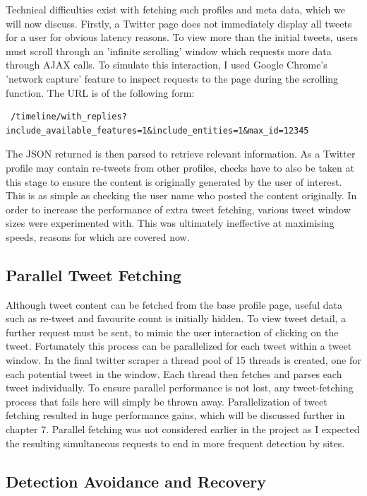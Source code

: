 Technical difficulties exist with fetching such profiles and meta data, which we will now discuss. Firstly, a Twitter page does not immediately display all tweets for a user for obvious latency reasons. To view more than the initial tweets, users must scroll through an 'infinite scrolling' window which requests more data through AJAX calls. To simulate this interaction, I used Google Chrome's 'network capture' feature to inspect requests to the page during the scrolling function. The URL is of the following form:

\begin{verbatim}
 /timeline/with_replies?include_available_features=1&include_entities=1&max_id=12345
\end{verbatim}

\noindent The JSON returned is then parsed to retrieve relevant information. As a Twitter profile may contain re-tweets from other profiles, checks have to also be taken at this stage to ensure the content is originally generated by the user of interest. This is as simple as checking the user name who posted the content originally. In order to increase the performance of extra tweet fetching, various tweet window sizes were experimented with. This was ultimately ineffective at maximising speeds, reasons for which are covered now.

\subsection{Parallel Tweet Fetching}

Although tweet content can be fetched from the base profile page, useful data such as re-tweet and favourite count is initially hidden. To view tweet detail, a further request must be sent, to mimic the user interaction of clicking on the tweet. Fortunately this process can be parallelized for each tweet within a tweet window. In the final twitter scraper a thread pool of 15 threads is created, one for each potential tweet in the window. Each thread then fetches and parses each tweet individually. To ensure parallel performance is not lost, any tweet-fetching process that fails here will simply be thrown away. Parallelization of tweet fetching resulted in huge performance gains, which will be discussed further in chapter 7. Parallel fetching was not considered earlier in the project as I expected the resulting simultaneous requests to end in more frequent detection by sites. 

\subsection{Detection Avoidance and Recovery}

